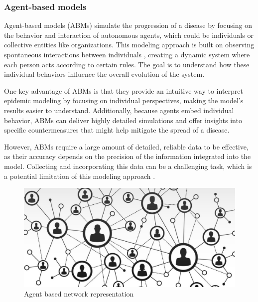 \subsubsection{Agent-based models}
Agent-based models (ABMs) simulate the progression of a disease by focusing on the behavior and interaction of autonomous agents, which could be individuals or collective entities like organizations. This modeling approach is built on observing spontaneous interactions between individuals \cite{Tizzoni2014}, creating a dynamic system where each person acts according to certain rules. The goal is to understand how these individual behaviors influence the overall evolution of the system.

One key advantage of ABMs is that they provide an intuitive way to interpret epidemic modeling by focusing on individual perspectives, making the model's results easier to understand. Additionally, because agents embed individual behavior, ABMs can deliver highly detailed simulations and offer insights into specific countermeasures that might help mitigate the spread of a disease.

However, ABMs require a large amount of detailed, reliable data to be effective, as their accuracy depends on the precision of the information integrated into the model. Collecting and incorporating this data can be a challenging task, which is a potential limitation of this modeling approach \cite{Hernandez_Vargas_2022}.
\begin{figure}
	\centering
	\includegraphics[width=0.5\linewidth]{0_introduction/images_introduction/agent_based}
	\caption[Agent based network representation]{Agent based network representation}
	\label{fig:agentbased}
\end{figure}

